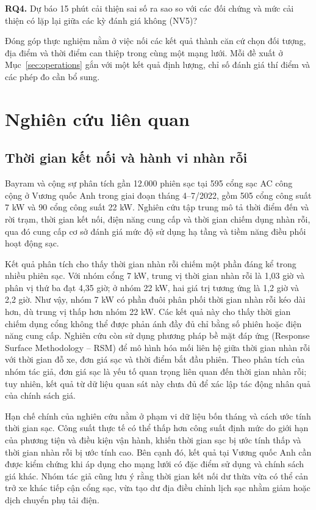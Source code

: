 \documentclass[conference,a4paper]{IEEEtran}
\begin{document}
\noindent\textbf{RQ4.} Dự báo 15 phút cải thiện sai số ra sao so với các đối chứng và mức cải thiện có lặp lại giữa các kỳ đánh giá không (NV5)?

Đóng góp thực nghiệm nằm ở việc nối các kết quả thành căn cứ chọn đối tượng, địa điểm và thời điểm can thiệp trong cùng một mạng lưới. Mỗi đề xuất ở Mục~\ref{sec:operations} gắn với một kết quả định lượng, chỉ số đánh giá thí điểm và các phép đo cần bổ sung.

\section{Nghiên cứu liên quan}
\subsection{Thời gian kết nối và hành vi nhàn rỗi}

Bayram và cộng sự \cite{bayram2023} phân tích gần 12.000 phiên sạc tại 595 cổng sạc AC công cộng ở Vương quốc Anh trong giai đoạn tháng 4–7/2022, gồm 505 cổng công suất 7 kW và 90 cổng công suất 22 kW. Nghiên cứu tập trung mô tả thời điểm đến và rời trạm, thời gian kết nối, điện năng cung cấp và thời gian chiếm dụng nhàn rỗi, qua đó cung cấp cơ sở đánh giá mức độ sử dụng hạ tầng và tiềm năng điều phối hoạt động sạc.

Kết quả phân tích cho thấy thời gian nhàn rỗi chiếm một phần đáng kể trong nhiều phiên sạc. Với nhóm cổng 7 kW, trung vị thời gian nhàn rỗi là 1,03 giờ và phân vị thứ ba đạt 4,35 giờ; ở nhóm 22 kW, hai giá trị tương ứng là 1,2 giờ và 2,2 giờ. Như vậy, nhóm 7 kW có phần đuôi phân phối thời gian nhàn rỗi kéo dài hơn, dù trung vị thấp hơn nhóm 22 kW. Các kết quả này cho thấy thời gian chiếm dụng cổng không thể được phản ánh đầy đủ chỉ bằng số phiên hoặc điện năng cung cấp. Nghiên cứu còn sử dụng phương pháp bề mặt đáp ứng (Response Surface Methodology – RSM) để mô hình hóa mối liên hệ giữa thời gian nhàn rỗi với thời gian đỗ xe, đơn giá sạc và thời điểm bắt đầu phiên. Theo phân tích của nhóm tác giả, đơn giá sạc là yếu tố quan trọng liên quan đến thời gian nhàn rỗi; tuy nhiên, kết quả từ dữ liệu quan sát này chưa đủ để xác lập tác động nhân quả của chính sách giá.

Hạn chế chính của nghiên cứu nằm ở phạm vi dữ liệu bốn tháng và cách ước tính thời gian sạc. Công suất thực tế có thể thấp hơn công suất định mức do giới hạn của phương tiện và điều kiện vận hành, khiến thời gian sạc bị ước tính thấp và thời gian nhàn rỗi bị ước tính cao. Bên cạnh đó, kết quả tại Vương quốc Anh cần được kiểm chứng khi áp dụng cho mạng lưới có đặc điểm sử dụng và chính sách giá khác. Nhóm tác giả cũng lưu ý rằng thời gian kết nối dư thừa vừa có thể cản trở xe khác tiếp cận cổng sạc, vừa tạo dư địa điều chỉnh lịch sạc nhằm giảm hoặc dịch chuyển phụ tải điện.
\end{document}
